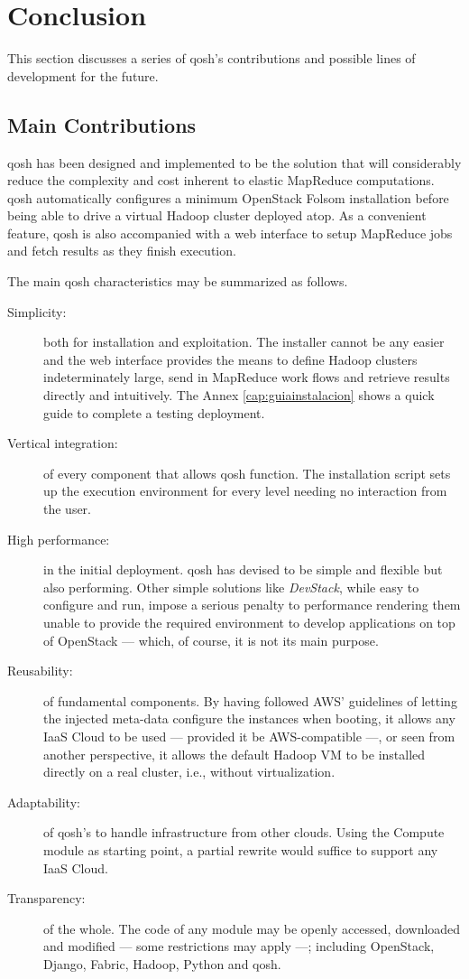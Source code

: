 \chapter*{Conclusion}\label{cap:aportaciones}
\noindent This section discusses a series of qosh's contributions and possible lines of development for the future.

\section*{Main Contributions}\label{sec:bondadesdeficiencias}
\noindent qosh has been designed and implemented to be the solution that will considerably reduce the complexity and cost inherent to elastic MapReduce computations. qosh automatically configures a minimum OpenStack Folsom installation before being able to drive a virtual Hadoop cluster deployed atop. As a convenient feature, qosh is also accompanied with a web interface to setup MapReduce jobs and fetch results as they finish execution.

The main qosh characteristics may be summarized as follows.

\begin{description}
    \item[Simplicity:] both for installation and exploitation. The installer cannot be any easier and the web interface provides the means to define Hadoop clusters indeterminately large, send in MapReduce work flows and retrieve results directly and intuitively. The Annex \ref{cap:guiainstalacion} shows a quick guide to complete a testing deployment.
    \item[Vertical integration:] of every component that allows qosh function. The installation script sets up the execution environment for every level needing no interaction from the user.
    \item[High performance:] in the initial deployment. qosh has devised to be simple and flexible but also performing. Other simple solutions like \emph{DevStack}, while easy to configure and run, impose a serious penalty to performance rendering them unable to provide the required environment to develop applications on top of OpenStack --- which, of course, it is not its main purpose.
    \item[Reusability:] of fundamental components. By having followed AWS' guidelines of letting the injected meta-data configure the instances when booting, it allows any IaaS Cloud to be used --- provided it be AWS-compatible ---, or seen from another perspective, it allows the default Hadoop VM to be installed directly on a real cluster, i.e., without virtualization.
    \item[Adaptability:] of qosh's to handle infrastructure from other clouds. Using the Compute module as starting point, a partial rewrite would suffice to support any IaaS Cloud.
    \item[Transparency:] of the whole. The code of any module may be openly accessed, downloaded and modified --- some restrictions may apply ---; including OpenStack, Django, Fabric, Hadoop, Python and qosh.
\end{description}

